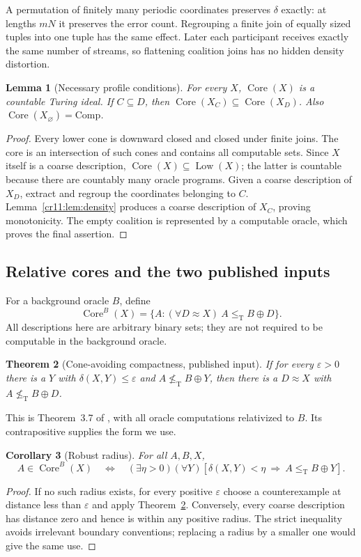 \documentclass[11pt,letterpaper]{article}
\theoremstyle{plain}
\newtheorem{theorem}{Theorem}[section]
\newtheorem{lemma}[theorem]{Lemma}
\newtheorem{corollary}[theorem]{Corollary}
\theoremstyle{definition}
\theoremstyle{remark}
\numberwithin{equation}{section}
\newcommand{\leT}{\leq_{\mathrm T}}
\newcommand{\nleT}{\nleq_{\mathrm T}}
\newcommand{\Core}{\operatorname{Core}}
\newcommand{\Low}{\operatorname{Low}}
\newcommand{\Comp}{\mathrm{Comp}}
\newcommand{\join}{\mathbin{\oplus}}
\newcommand{\eps}{\varepsilon}
\begin{document}
A permutation of finitely many periodic coordinates preserves $\delta$
exactly: at lengths $mN$ it preserves the error count. Regrouping a finite
join of equally sized tuples into one tuple has the same effect. Later each
participant receives exactly the same number of streams, so flattening
coalition joins has no hidden density distortion.

\begin{lemma}[Necessary profile conditions]\label{cr11:lem:necessity}
For every $X$, $\Core(X)$ is a countable Turing ideal. If $C\subseteq D$,
then $\Core(X_C)\subseteq\Core(X_D)$. Also
$\Core(X_\varnothing)=\Comp$.
\end{lemma}
\begin{proof}
Every lower cone is downward closed and closed under finite joins. The core
is an intersection of such cones and contains all computable sets. Since
$X$ itself is a coarse description, $\Core(X)\subseteq\Low(X)$; the latter
is countable because there are countably many oracle programs. Given a
coarse description of $X_D$, extract and regroup the coordinates belonging
to $C$. Lemma~\ref{cr11:lem:density} produces a coarse description of $X_C$,
proving monotonicity. The empty coalition is represented by a computable
oracle, which proves the final assertion.
\end{proof}

\subsection{Relative cores and the two published inputs}

For a background oracle $B$, define
\[
 \Core^B(X)=\{A:(\forall D\approx X)\ A\leT B\join D\}.
\]
All descriptions here are arbitrary binary sets; they are not required to
be computable in the background oracle.

\begin{theorem}[Cone-avoiding compactness, published input]\label{cr11:thm:compact}
If for every $\eps>0$ there is a $Y$ with $\delta(X,Y)\leq\eps$ and
$A\nleT B\join Y$, then there is a $D\approx X$ with
$A\nleT B\join D$.
\end{theorem}

This is Theorem~3.7 of \cite{HJKS}, with all oracle computations relativized
to $B$. Its contrapositive supplies the form we use.

\begin{corollary}[Robust radius]\label{cr11:cor:radius}
For all $A,B,X$,
\begin{equation}\label{cr11:eq:radius}
 A\in\Core^B(X)
 \quad\Longleftrightarrow\quad
 (\exists\eta>0)(\forall Y)
       [\delta(X,Y)<\eta\ \Longrightarrow\ A\leT B\join Y].
\end{equation}
\end{corollary}
\begin{proof}
If no such radius exists, for every positive $\eps$ choose a counterexample
at distance less than $\eps$ and apply Theorem~\ref{cr11:thm:compact}.
Conversely, every coarse description has distance zero and hence is within
any positive radius. The strict inequality avoids irrelevant boundary
conventions; replacing a radius by a smaller one would give the same use.
\end{proof}
\end{document}
